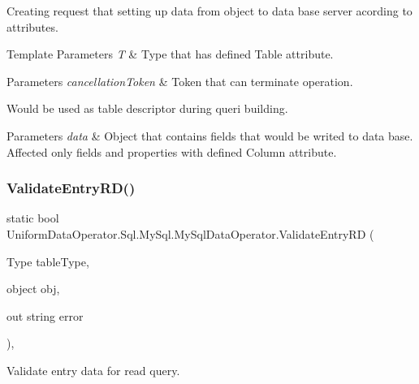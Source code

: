 Creating request that setting up data from object to data base server acording to attributes. 


\begin{DoxyTemplParams}{Template Parameters}
{\em T} & Type that has defined Table attribute. 
\begin{DoxyParams}{Parameters}
{\em cancellation\+Token} & Token that can terminate operation.\\
\hline
\end{DoxyParams}
Would be used as table descriptor during queri building.\\
\hline
\end{DoxyTemplParams}

\begin{DoxyParams}{Parameters}
{\em data} & Object that contains fields that would be writed to data base. Affected only fields and properties with defined Column attribute.\\
\hline
\end{DoxyParams}
\mbox{\label{class_uniform_data_operator_1_1_sql_1_1_my_sql_1_1_my_sql_data_operator_a821d08d641098b3f5e4dd6342a3db718}} 
\subsubsection{\texorpdfstring{Validate\+Entry\+R\+D()}{ValidateEntryRD()}}
{\footnotesize\ttfamily static bool Uniform\+Data\+Operator.\+Sql.\+My\+Sql.\+My\+Sql\+Data\+Operator.\+Validate\+Entry\+RD (\begin{DoxyParamCaption}\item[{Type}]{table\+Type,  }\item[{object}]{obj,  }\item[{out string}]{error }\end{DoxyParamCaption})\hspace{0.3cm}{\ttfamily [static]}, {\ttfamily [private]}}



Validate entry data for read query. 


